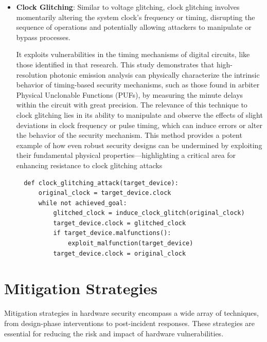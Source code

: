 \begin{itemize}
\item
  \textbf{Clock Glitching}: Similar to voltage glitching, clock
  glitching involves momentarily altering the system clock's frequency or timing, disrupting the sequence of
operations and potentially allowing attackers to manipulate or bypass
processes.\cite{bar-elSorcererApprenticeGuide2004}

It exploits vulnerabilities in the timing mechanisms of digital circuits, like those identified in that research\cite{tajikPhysicalCharacterizationArbiter2014}. This study demonstrates that high-resolution photonic emission analysis can physically characterize the intrinsic behavior of timing-based security mechanisms, such as those found in arbiter Physical Unclonable Functions (PUFs), by measuring the minute delays within the circuit with great precision. The relevance of this technique to clock glitching lies in its ability to manipulate and observe the effects of slight deviations in clock frequency or pulse timing, which can induce errors or alter the behavior of the security mechanism. This method provides a potent example of how even robust security designs can be undermined by exploiting their fundamental physical properties—highlighting a critical area for enhancing resistance to clock glitching attacks

\begin{verbatim}
  def clock_glitching_attack(target_device):
      original_clock = target_device.clock
      while not achieved_goal:
          glitched_clock = induce_clock_glitch(original_clock)
          target_device.clock = glitched_clock
          if target_device.malfunctions():
              exploit_malfunction(target_device)
          target_device.clock = original_clock 
  \end{verbatim}

\end{itemize}

\hypertarget{mitigation-strategies}{%
\section{Mitigation Strategies}\label{mitigation-strategies}}

Mitigation strategies in hardware security encompass a wide array of
techniques, from design-phase interventions to post-incident responses.
These strategies are essential for reducing the risk and impact of
hardware vulnerabilities.

